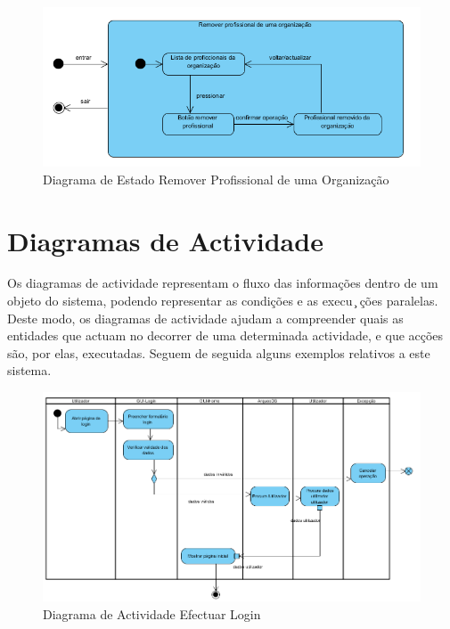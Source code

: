 ﻿\documentclass[12pt,a4paper]{article}
\begin{document}
\begin{figure}[h!]
\centering
\includegraphics[scale=0.8]{estado/removerprofissional}
\caption{Diagrama de Estado Remover Profissional de uma Organização} 
\end{figure}   
  
\clearpage
\section{Diagramas de Actividade} 
 Os diagramas de actividade representam o fluxo das informações dentro de um objeto do sistema, podendo representar as condições e as execu ̧
ções paralelas. Deste modo, os diagramas de actividade ajudam a compreender quais as entidades que actuam no decorrer de uma
determinada actividade, e que acções são, por elas, executadas. Seguem de seguida alguns
exemplos relativos a este sistema.
 
\begin{figure}[h!]
\centering
\includegraphics[scale=0.7]{actividade/lofin}
\caption{Diagrama de Actividade Efectuar Login} 
\end{figure} 
\end{document}

